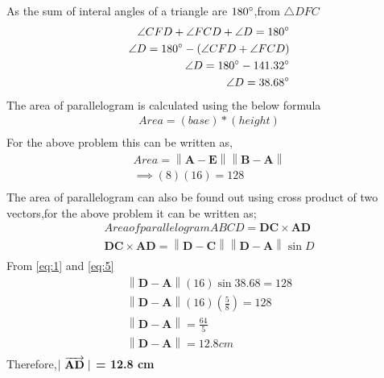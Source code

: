 \documentclass{article}
\providecommand{\norm}[1]{\left\lVert#1\right\rVert}
\let\vec\mathbf
\begin{document}
As the sum of interal angles of a triangle are $180\degree$,from $\triangle{DFC}$\\
\begin{align}
	\angle{CFD} + \angle{FCD} + \angle{D} = 180\degree\\
	\angle{D} = 180\degree - (\angle{CFD} + \angle{FCD})\\
	\angle{D} = 180\degree - 141.32\degree \\
	\angle{D} = 38.68\degree
	\label{eq:3}\\
\end{align}
The area of parallelogram is calculated using the below formula\\
\begin{align}
	Area = (base)*(height)\\
\end{align}
For the above problem this can be written as,
\begin{align}
	Area = \norm{\vec{A} - \vec{E}} \norm{\vec{B} - \vec{A}}\\
	\implies (8) (16) = 128
	\label{eq:4}\\
\end{align}
The area of parallelogram can also be found out using cross product of two vectors,for the above problem it can be written as;
\begin{align}
	Area of parallelogram ABCD = \vec{DC} \times \vec{AD}\\
	\vec{DC} \times \vec{AD} = \norm{\vec{D} - \vec{C}} \norm{\vec{D} - \vec{A}} \sin{D}
	\label{eq:5}\\
\end{align}
From \ref{eq:1} and \ref{eq:5}\\
\begin{align}
	\norm{\vec{D} - \vec{A}} (16) \sin{38.68} = 128\\
	\norm{\vec{D} - \vec{A}} (16) (\frac{5}{8}) = 128\\
	\norm{\vec{D} - \vec{A}} = \frac{64}{5}\\
	\norm{\vec{D} - \vec{A}} = 12.8cm\\
\end{align}
Therefore,$|\hspace{0.1cm}$\textbf{$\overrightarrow{\vec{AD}}\hspace{0.1cm} |$ = 12.8 cm}\\
\end{document}
